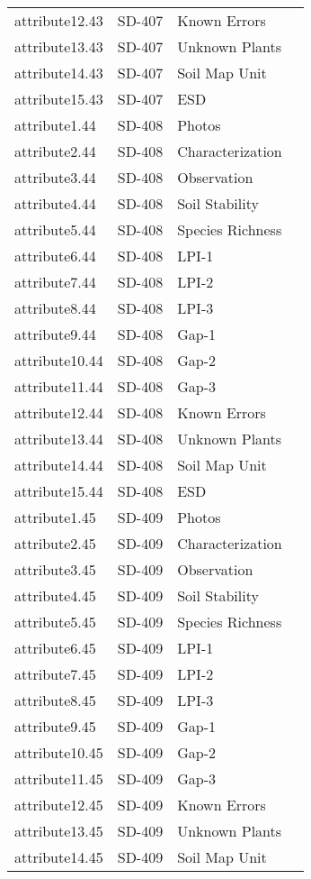 \documentclass[
]{article}
\begin{document}
\begin{longtable}[]{@{}llll@{}}
attribute12.43 & SD-407 & Known Errors & \\
attribute13.43 & SD-407 & Unknown Plants & \\
attribute14.43 & SD-407 & Soil Map Unit & \\
attribute15.43 & SD-407 & ESD & \\
attribute1.44 & SD-408 & Photos & \\
attribute2.44 & SD-408 & Characterization & \\
attribute3.44 & SD-408 & Observation & \\
attribute4.44 & SD-408 & Soil Stability & \\
attribute5.44 & SD-408 & Species Richness & \\
attribute6.44 & SD-408 & LPI-1 & \\
attribute7.44 & SD-408 & LPI-2 & \\
attribute8.44 & SD-408 & LPI-3 & \\
attribute9.44 & SD-408 & Gap-1 & \\
attribute10.44 & SD-408 & Gap-2 & \\
attribute11.44 & SD-408 & Gap-3 & \\
attribute12.44 & SD-408 & Known Errors & \\
attribute13.44 & SD-408 & Unknown Plants & \\
attribute14.44 & SD-408 & Soil Map Unit & \\
attribute15.44 & SD-408 & ESD & \\
attribute1.45 & SD-409 & Photos & \\
attribute2.45 & SD-409 & Characterization & \\
attribute3.45 & SD-409 & Observation & \\
attribute4.45 & SD-409 & Soil Stability & \\
attribute5.45 & SD-409 & Species Richness & \\
attribute6.45 & SD-409 & LPI-1 & \\
attribute7.45 & SD-409 & LPI-2 & \\
attribute8.45 & SD-409 & LPI-3 & \\
attribute9.45 & SD-409 & Gap-1 & \\
attribute10.45 & SD-409 & Gap-2 & \\
attribute11.45 & SD-409 & Gap-3 & \\
attribute12.45 & SD-409 & Known Errors & \\
attribute13.45 & SD-409 & Unknown Plants & \\
attribute14.45 & SD-409 & Soil Map Unit & \\

\end{longtable}
\end{document}
